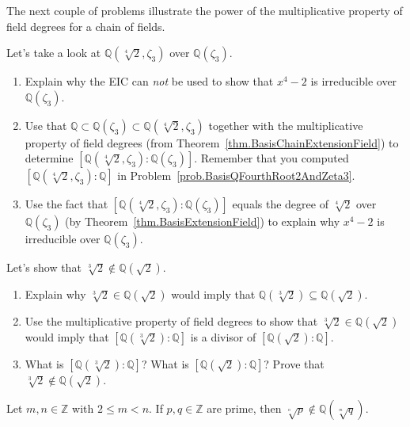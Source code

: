 The next couple of problems illustrate the power of the multiplicative property of field degrees for a chain of fields. 

\begin{problem}
Let's take a look at $\mathbb{Q}(\sqrt[4]{2},\zeta_3)$ over $\mathbb{Q}(\zeta_3)$.
\begin{enumerate}
\item Explain why the EIC can \emph{not} be used to show that $x^4-2$ is irreducible over $\mathbb{Q}(\zeta_3)$.
\item Use  that $\mathbb{Q}\subset \mathbb{Q}(\zeta_3) \subset \mathbb{Q}(\sqrt[4]{2},\zeta_3)$  together with the multiplicative property of field degrees (from Theorem~\ref{thm.BasisChainExtensionField}) to determine  $[\mathbb{Q}(\sqrt[4]{2},\zeta_3):\mathbb{Q}(\zeta_3)]$. Remember that you computed $[\mathbb{Q}(\sqrt[4]{2},\zeta_3):\mathbb{Q}]$ in Problem~\ref{prob.BasisQFourthRoot2AndZeta3}.
\item Use the fact that $[\mathbb{Q}(\sqrt[4]{2},\zeta_3):\mathbb{Q}(\zeta_3)]$ equals the degree of $\sqrt[4]{2}$ over $\mathbb{Q}(\zeta_3)$ (by Theorem~\ref{thm.BasisExtensionField}) to explain why $x^4-2$ is irreducible over $\mathbb{Q}(\zeta_3)$.
\end{enumerate}
\end{problem}

\begin{problem}
Let's show that $\sqrt[3]{2}\notin \mathbb{Q}(\sqrt{2})$.
\begin{enumerate}
\item Explain why $\sqrt[3]{2}\in \mathbb{Q}(\sqrt{2})$ would imply that $\mathbb{Q}(\sqrt[3]{2})\subseteq\mathbb{Q}(\sqrt{2})$.
\item Use the multiplicative property of field degrees to show that $\sqrt[3]{2}\in \mathbb{Q}(\sqrt{2})$ would imply that $[\mathbb{Q}(\sqrt[3]{2}):\mathbb{Q}]$ is a divisor of $[\mathbb{Q}(\sqrt{2}):\mathbb{Q}]$.
\item What is $[\mathbb{Q}(\sqrt[3]{2}):\mathbb{Q}]$? What is $[\mathbb{Q}(\sqrt{2}):\mathbb{Q}]$? Prove that $\sqrt[3]{2}\notin \mathbb{Q}(\sqrt{2})$.
\end{enumerate}
\end{problem}


\begin{theorem}
Let $m,n\in \mathbb{Z}$ with $2\le m<n$. If $p,q\in \mathbb{Z}$ are prime, then $\sqrt[\overset{n}{}]{p} \notin \mathbb{Q}(\sqrt[\overset{m}{}]{q})$.
\end{theorem}

